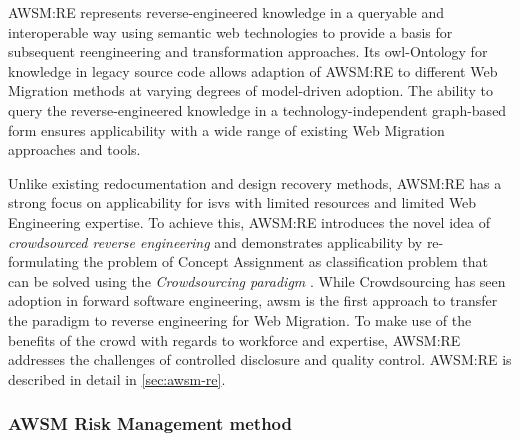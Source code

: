 AWSM:RE represents reverse-engineered knowledge in a queryable and interoperable way using semantic \gls{web} technologies to provide a basis for subsequent reengineering and transformation approaches.
Its \gls{owl}-Ontology for knowledge in legacy source code allows adaption of AWSM:RE to different \gls{Web Migration} methods at varying degrees of model-driven adoption.
The ability to query the reverse-engineered knowledge in a technology-independent graph-based form ensures applicability with a wide range of existing \gls{Web Migration} approaches and tools.

Unlike existing redocumentation and design recovery methods, AWSM:RE has a strong focus on applicability for \glspl{isv} with limited resources and limited \gls{Web Engineering} expertise.
To achieve this, AWSM:RE introduces the novel idea of \emph{crowdsourced reverse engineering} \autocite{Heil2018CSRE} and demonstrates applicability by re-formulating the problem of \gls{Concept Assignment} \autocite{Biggerstaff1994ConceptAssignmentJournal} as classification problem that can be solved using the \emph{\gls{Crowdsourcing} paradigm} \autocite{Howe2006}.
While \gls{Crowdsourcing} has seen adoption in forward software engineering, \gls{awsm} is the first approach to transfer the paradigm to reverse engineering for \gls{Web Migration}.
To make use of the benefits of the crowd with regards to workforce and expertise, AWSM:RE addresses the challenges of controlled disclosure and quality control.
AWSM:RE is described in detail in \cref{sec:awsm-re}.

\hypertarget{awsm-risk-management-method}{%
\subsubsection*{AWSM Risk Management method}\label{awsm-risk-management-method}}

